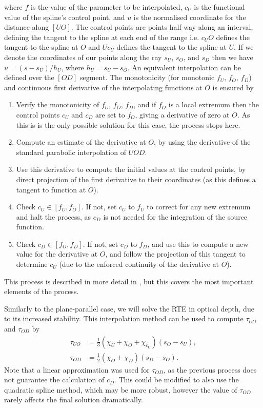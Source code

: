 where $f$ is the value of the parameter to be interpolated, $c_U$ is the functional value of the spline's control point, and $u$ is the normalised coordinate for the distance along $[UO]$.
The control points are points half way along an interval, defining the tangent to the spline at each end of the range i.e. $c_U O$ defines the tangent to the spline at $O$ and $U c_U$ defines the tangent to the spline at $U$.
If we denote the coordinates of our points along the ray $s_U$, $s_O$, and $s_D$ then we have $u = (s - s_U) / h_U$, where $h_U = s_U - s_O$.
An equivalent interpolation can be defined over the $[OD]$ segment.
The monotonicity (for monotonic $f_U$, $f_O$, $f_D$) and continuous first derivative of the interpolating functions at $O$ is ensured by
\begin{enumerate}
    \item Verify the monotonicity of $f_U$, $f_O$, $f_D$, and if $f_O$ is a local extremum then the control points $c_U$ and $c_D$ are set to $f_O$, giving a derivative of zero at $O$. As this is is the only possible solution for this case, the process stops here.

    \item Compute an estimate of the derivative at $O$, by using the derivative of the standard parabolic interpolation of $UOD$.

    \item Use this derivative to compute the initial values at the control points, by direct projection of the first derivative to their coordinates (as this defines a tangent to function at $O$).

    \item Check $c_U \in [f_U, f_O]$. If not, set $c_U$ to $f_U$ to correct for any new extremum and halt the process, as $c_D$ is not needed for the integration of the source function.

    \item Check $c_D \in [f_O, f_D]$. If not, set $c_D$ to $f_D$, and use this to compute a new value for the derivative at $O$, and follow the projection of this tangent to determine $c_U$ (due to the enforced continuity of the derivative at $O$).
\end{enumerate}
This process is described in more detail in \citet{Stepan2013}, but this covers the most important elements of the process.

Similarly to the plane-parallel case, we will solve the RTE in optical depth, due to its increased stability.
This interpolation method can be used to compute $\tau_{UO}$ and $\tau_{OD}$ by
\begin{align}
    \tau_{UO} &= \frac{1}{3}(\chi_U + \chi_O + \chi_{c_U}) (s_O - s_U),\\
    \tau_{OD} &= \frac{1}{2}(\chi_O + \chi_D) (s_D - s_O).
\end{align}
Note that a linear approximation was used for $\tau_{OD}$, as the previous process does not guarantee the calculation of $c_D$.
This could be modified to also use the quadratic spline method, which may be more robust, however the value of $\tau_{OD}$ rarely affects the final solution dramatically.


